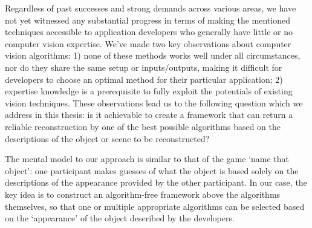 Regardless of past successes and strong demands across various areas, we have not yet witnessed any substantial progress in terms of making the mentioned techniques accessible to application developers who generally have little or no computer vision expertise. We've made two key observations about computer vision algorithms: 1) none of these methods works well under all circumstances, nor do they share the same setup or inputs/outputs, making it difficult for developers to choose an optimal method for their particular application; 2) expertise knowledge is a prerequisite to fully exploit the potentials of existing vision techniques. These observations lead us to the following question which we address in this thesis: is it achievable to create a framework that can return a reliable reconstruction by one of the best possible algorithms based on the descriptions of the object or scene to be reconstructed? 

The mental model to our approach is similar to that of the game `name that object': one participant makes guesses of what the object is based solely on the descriptions of the appearance provided by the other participant. In our case, the key idea is to construct an algorithm-free framework above the algorithms themselves, so that one or multiple appropriate algorithms can be selected based on the `appearance' of the object described by the developers.



